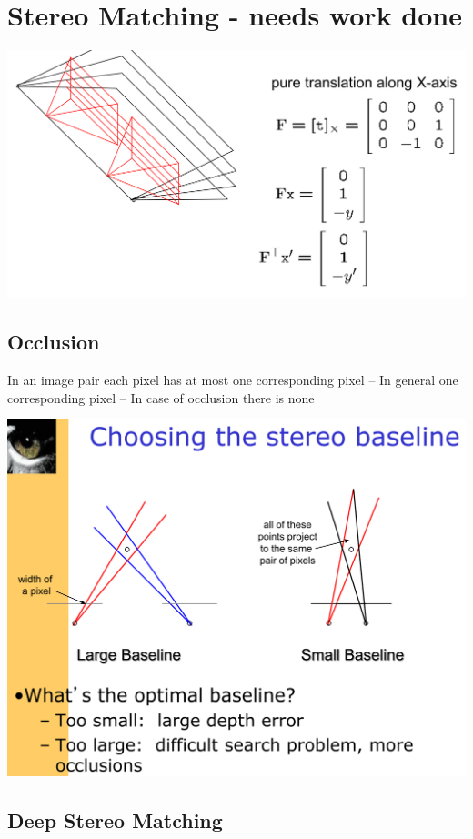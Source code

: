 \section{Stereo Matching - needs work done}

\includegraphics[width=\columnwidth]{pictures/standardstereo}


\subsection{Occlusion}
In an image pair each pixel has at most one corresponding pixel – In general one corresponding pixel – In case of occlusion there is none

\includegraphics[width=\columnwidth]{pictures/stereobaseline}

\subsection{Deep Stereo Matching}


